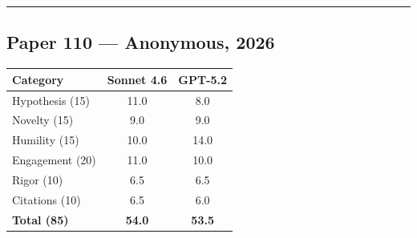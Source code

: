 \documentclass[11pt]{article}
\begin{document}
\bigskip
\hrule
\bigskip

\subsection*{Paper 110 --- Anonymous, 2026}

\medskip

\begin{tabular}{lcc}
\toprule
\textbf{Category} & \textbf{Sonnet 4.6} & \textbf{GPT-5.2} \\
\midrule
Hypothesis (15) & 11.0 & 8.0 \\
Novelty (15) & 9.0 & 9.0 \\
Humility (15) & 10.0 & 14.0 \\
Engagement (20) & 11.0 & 10.0 \\
Rigor (10) & 6.5 & 6.5 \\
Citations (10) & 6.5 & 6.0 \\
\midrule
\textbf{Total (85)} & \textbf{54.0} & \textbf{53.5} \\
\bottomrule
\end{tabular}

\bigskip
\end{document}
